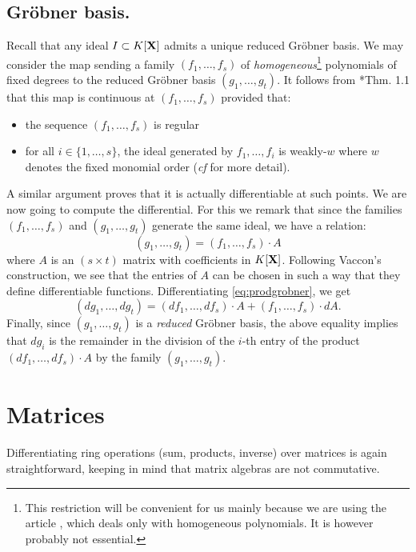 \documentclass{sig-alternate}
\begin{document}
{\subsection*{Gr\"obner basis.}

Recall that any 
ideal $I \subset K[\mathbf X]$ admits a unique reduced Gr\"obner basis. We may
consider the map sending a family $(f_1, \ldots, f_s)$ of 
\emph{homogeneous}\footnote{This restriction will be convenient for us 
mainly because we are using the article \cite{vaccon:14a}, which deals only 
with homogeneous polynomials. It is however probably not essential.} 
polynomials of fixed degrees to the reduced Gr\"obner basis $(g_1, 
\ldots, g_t)$. It follows from \cite{vaccon:14a}*{Thm. 1.1} that this 
map is continuous at $(f_1, \ldots, f_s)$ provided that:
\begin{itemize}
\item the sequence $(f_1, \ldots, f_s)$ is regular
\item for all $i \in \{1, \ldots, s\}$, the ideal generated by
$f_1, \ldots, f_i$ is weakly-$w$ where $w$ denotes the fixed monomial
order (\emph{cf} \cite{vaccon:14a} for more detail).
\end{itemize}
A similar argument proves that it is actually differentiable at such
points. We are now going to compute the differential. For this we
remark that since the families $(f_1, \ldots, f_s)$ and $(g_1, \ldots,
g_t)$ generate the same ideal, we have a relation:
\begin{equation}
\label{eq:prodgrobner}
(g_1, \ldots, g_t) = (f_1, \ldots, f_s) \cdot A
\end{equation}
where $A$ is an $(s \times t)$ matrix with coefficients in $K[\mathbf X]$.
Following Vaccon's construction, we see that the entries of $A$ 
can be chosen in such a way that they define differentiable functions.
Differentiating \eqref{eq:prodgrobner}, we get
$$(d g_1, \ldots, d g_t) =
(d f_1, \ldots, d f_s) \cdot A + (f_1, \ldots, f_s) \cdot dA.$$
Finally, since $(g_1, \ldots, g_t)$ is a \emph{reduced} Gr\"obner
basis, the above equality implies that $d g_i$ is the remainder in
the division of the $i$-th entry of the product
$(d f_1, \ldots, d f_s) \cdot A$ by the family $(g_1, \ldots, g_t)$.

\section{Matrices}
\label{sec:matrices}

Differentiating ring operations (sum, products, inverse) over matrices 
is again straightforward, keeping in mind that matrix algebras are not
commutative.

}
\end{document}
